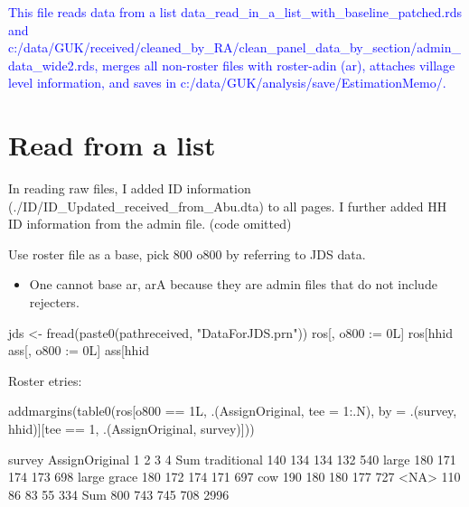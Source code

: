 \setcounter{tocdepth}{3}
\tableofcontents
\newpage

\setlength{\parindent}{1em}
\vspace{2ex}













\textcolor{blue}{This file reads data from a list \textsf{data\_read\_in\_a\_list\_with\_baseline\_patched.rds} and c:/data/GUK/received/cleaned\_by\_RA/clean\_panel\_data\_by\_section/admin\_data\_wide2.rds, merges all non-roster files with roster-adin (\textsf{ar}), attaches village level information, and saves in c:/data/GUK/analysis/save/EstimationMemo/.}






\section{Read from a list}

In reading raw files, I added ID information (\textsf{\footnotesize ./ID/ID\_Updated\_received\_from\_Abu.dta}) to all pages. I further added HH ID information from the admin file. \textsf{(code omitted)}



Use roster file as a base, pick 800 \textsf{o800} by referring to JDS data.
\begin{itemize}
\vspace{1.0ex}\setlength{\itemsep}{1.0ex}\setlength{\baselineskip}{12pt}
\item	One cannot base \textsf{ar}, \textsf{arA} because they are admin files that do not include rejecters.
\end{itemize}
\begin{Schunk}
\begin{Sinput}
jds <- fread(paste0(pathreceived, "DataForJDS.prn"))
ros[, o800 := 0L]
ros[hhid %in% jds[grepl("trea", treat), hhid], o800 := 1L]
ass[, o800 := 0L]
ass[hhid %in% jds[grepl("trea", treat), hhid], o800 := 1L]
\end{Sinput}
\end{Schunk}
Roster etries:
\begin{Schunk}
\begin{Sinput}
addmargins(table0(ros[o800 == 1L, .(AssignOriginal, tee = 1:.N), 
  by = .(survey, hhid)][tee == 1, .(AssignOriginal, survey)]))
\end{Sinput}
\begin{Soutput}
              survey
AssignOriginal    1    2    3    4  Sum
   traditional  140  134  134  132  540
   large        180  171  174  173  698
   large grace  180  172  174  171  697
   cow          190  180  180  177  727
   <NA>         110   86   83   55  334
   Sum          800  743  745  708 2996
\end{Soutput}
\end{Schunk}

